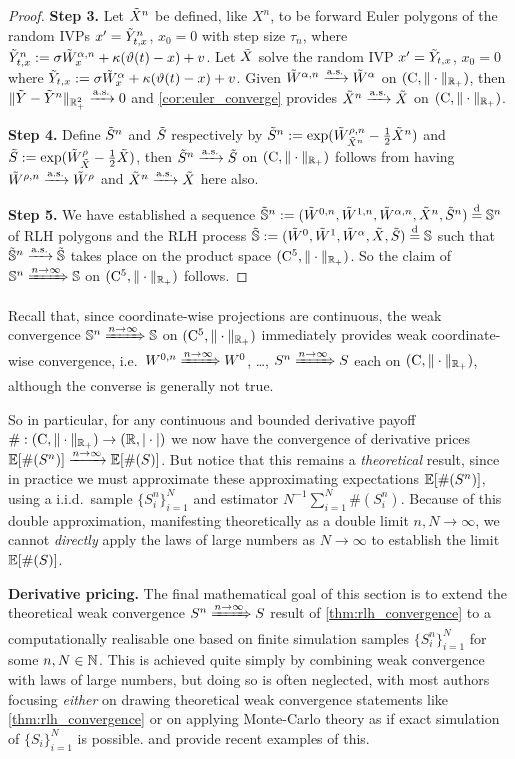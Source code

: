 \begin{proof}
    \textbf{Step 3.} Let $\tilde{X}^n$ be defined, like $X^n$, to be forward Euler polygons of the random IVPs $x'={\tilde{Y}}^n_{t,x}$, $x_0=0$ with step size $\tau_n$, where ${\tilde{Y}}^n_{t,x}:=\sigma \tilde{W}^{\alpha,n}_x + \kappa(\vartheta(t) - x)+v$. Let $\tilde{X}$ solve the random IVP $x'={\tilde{Y}}_{t,x}$, $x_0=0$ where ${\tilde{Y}}_{t,x}:=\sigma \tilde{W}^{\alpha}_x + \kappa(\vartheta(t) - x)+v$. Given $\tilde{W}^{\alpha,n} \xrightarrow{\mathrm{a.s.}} \tilde{W}^\alpha$ on $(\mathrm{C},\Vert\cdot\Vert_{\mathbb{R}_+})$, then $\Vert {\tilde{Y}} - {\tilde{Y}}^n \Vert_{\mathbb{R}_+^2} \xrightarrow{\mathrm{a.s.}} 0$ and \autoref{cor:euler_converge} provides $\tilde{X}^n \xrightarrow{\mathrm{a.s.}} \tilde{X}$ on $(\mathrm{C},\Vert\cdot\Vert_{\mathbb{R}_+})$.

    \textbf{Step 4.} Define $\tilde{S}^n$ and $\tilde{S}$ respectively by $\tilde{S}^n:=\exp(\tilde{W}^{\rho,n}_{\tilde{X}^n} - \frac12\tilde{X}^n)$ and $\tilde{S}:=\exp(\tilde{W}^\rho_{\tilde{X}} - \frac12\tilde{X})$, then $\tilde{S}^n \xrightarrow{\mathrm{a.s.}} \tilde{S}$ on $(\mathrm{C},\Vert\cdot\Vert_{\mathbb{R}_+})$ follows from having $\tilde{W}^{\rho,n} \xrightarrow{\mathrm{a.s.}} \tilde{W}^\rho$ and $\tilde{X}^n \xrightarrow{\mathrm{a.s.}} \tilde{X}$ here also.

    \textbf{Step 5.} We have established a sequence $\tilde{\mathbb{S}}^n:=(\tilde{W}^{0,n},\tilde{W}^{1,n},\tilde{W}^{\alpha,n},\tilde{X}^n,\tilde{S}^n)\stackrel{\mathrm{d}}{=}\mathbb{S}^n$ of RLH polygons and the RLH process $\tilde{\mathbb{S}}:=(\tilde{W}^0,\tilde{W}^1,\tilde{W}^\alpha,\tilde{X},\tilde{S})\stackrel{\mathrm{d}}{=} \mathbb{S}$ such that $\tilde{\mathbb{S}}^n\xrightarrow{\mathrm{a.s.}}\tilde{\mathbb{S}}$ takes place on the product space $(\mathrm{C}^5,\Vert\cdot\Vert_{\mathbb{R}_+})$. So the claim of $\mathbb{S}^n\xRightarrow{n\to\infty}\mathbb{S}$ on $(\mathrm{C}^5,\Vert\cdot\Vert_{\mathbb{R}_+})$ follows.
\end{proof}

Recall that, since coordinate-wise projections are continuous, the weak convergence $\mathbb{S}^n\xRightarrow{n\to\infty}\mathbb{S}$ on  $(\mathrm{C}^5,\Vert\cdot\Vert_{\mathbb{R}_+})$ immediately provides weak coordinate-wise convergence, i.e.~$W^{0,n}\xRightarrow{n\to\infty} W^0$, \dots, $S^n\xRightarrow{n\to\infty} S$ each on $(\mathrm{C},\Vert\cdot\Vert_{\mathbb{R}_+})$, although the converse is generally not true.

So in particular, for any continuous and bounded derivative payoff $\#:(\mathrm{C},\Vert\cdot\Vert_{\mathbb{R}_+})\to(\mathbb{R},|\cdot|)$ we now have the convergence of derivative prices $\mathbb{E}[\#(S^n)]\xrightarrow{n\to\infty}\mathbb{E}[\#(S)]$. But notice that this remains a \emph{theoretical} result, since in practice we must approximate these approximating expectations $\mathbb{E}[\#(S^n)]$, using a i.i.d.~sample $\{S^n_i\}_{i=1}^N$ and estimator $N^{-1}\sum_{i=1}^N \#(S^n_i)$. Because of this double approximation, manifesting theoretically as a double limit $n,N\to\infty$, we cannot \emph{directly} apply the laws of large numbers as $N\to\infty$ to establish the limit $\mathbb{E}[\#(S)]$.

\vspace{3mm}\textbf{Derivative pricing.} The final mathematical goal of this section is to extend the theoretical weak convergence $S^n\xRightarrow{n\to\infty} S$ result of \autoref{thm:rlh_convergence} to a computationally realisable one based on finite simulation samples $\{S_i^n\}_{i=1}^N$ for some $n,N\in\mathbb{N}$. This is achieved quite simply by combining weak convergence with laws of large numbers, but doing so is often neglected, with most authors focusing \emph{either} on drawing theoretical weak convergence statements like \autoref{thm:rlh_convergence} or on applying Monte-Carlo theory as if exact simulation of $\{S_i\}_{i=1}^N$ is possible. \cite{horvath_2024} and \cite{mccrickerd_2018} provide recent examples of this.


